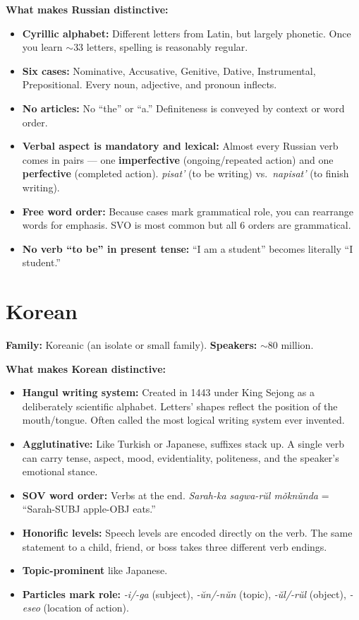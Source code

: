 \documentclass[11pt, letterpaper]{article}
\begin{document}
\textbf{What makes Russian distinctive:}
\begin{itemize}[noitemsep]
  \item \textbf{Cyrillic alphabet:} Different letters from Latin, but largely phonetic. Once you learn $\sim$33 letters, spelling is reasonably regular.
  \item \textbf{Six cases:} Nominative, Accusative, Genitive, Dative, Instrumental, Prepositional. Every noun, adjective, and pronoun inflects.
  \item \textbf{No articles:} No ``the'' or ``a.'' Definiteness is conveyed by context or word order.
  \item \textbf{Verbal aspect is mandatory and lexical:} Almost every Russian verb comes in pairs --- one \textbf{imperfective} (ongoing/repeated action) and one \textbf{perfective} (completed action). \emph{pisat'} (to be writing) vs.\ \emph{napisat'} (to finish writing).
  \item \textbf{Free word order:} Because cases mark grammatical role, you can rearrange words for emphasis. SVO is most common but all 6 orders are grammatical.
  \item \textbf{No verb ``to be'' in present tense:} ``I am a student'' becomes literally ``I student.''
\end{itemize}

\section*{Korean}

\textbf{Family:} Koreanic (an isolate or small family). \textbf{Speakers:} $\sim$80 million.

\textbf{What makes Korean distinctive:}
\begin{itemize}[noitemsep]
  \item \textbf{Hangul writing system:} Created in 1443 under King Sejong as a deliberately scientific alphabet. Letters' shapes reflect the position of the mouth/tongue. Often called the most logical writing system ever invented.
  \item \textbf{Agglutinative:} Like Turkish or Japanese, suffixes stack up. A single verb can carry tense, aspect, mood, evidentiality, politeness, and the speaker's emotional stance.
  \item \textbf{SOV word order:} Verbs at the end. \emph{Sarah-ka sagwa-r\u{u}l m\v{o}kn\v{u}nda} = ``Sarah-SUBJ apple-OBJ eats.''
  \item \textbf{Honorific levels:} Speech levels are encoded directly on the verb. The same statement to a child, friend, or boss takes three different verb endings.
  \item \textbf{Topic-prominent} like Japanese.
  \item \textbf{Particles mark role:} \emph{-i/-ga} (subject), \emph{-\u{u}n/-n\u{u}n} (topic), \emph{-\u{u}l/-r\u{u}l} (object), \emph{-eseo} (location of action).
\end{itemize}
\end{document}
